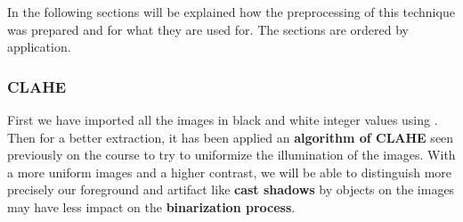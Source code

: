 \documentclass[10pt]{article}
\begin{document}
In the following sections will be explained how the preprocessing of this technique was prepared and for what they are used for. The sections are ordered by application.

\subsubsection*{CLAHE}

First we have imported all the images in black and white integer values using . Then for a better extraction, it has been applied an \textbf{algorithm of CLAHE} seen previously on the course to try to uniformize the illumination of the images. With a more uniform images and a higher contrast, we will be able to distinguish more precisely our foreground and artifact like \textbf{cast shadows} by objects on the images may have less impact on the \textbf{binarization process}. 
\end{document}
